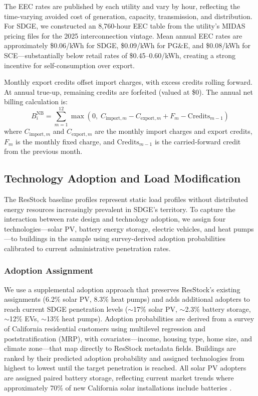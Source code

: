 \documentclass[12pt]{article}
\begin{document}
The EEC rates are published by each utility and vary by hour, reflecting the time-varying avoided cost of generation, capacity, transmission, and distribution. For SDGE, we constructed an 8,760-hour EEC table from the utility's MIDAS pricing files for the 2025 interconnection vintage. Mean annual EEC rates are approximately \$0.06/kWh for SDGE, \$0.09/kWh for PG\&E, and \$0.08/kWh for SCE---substantially below retail rates of \$0.45--0.60/kWh, creating a strong incentive for self-consumption over export.

Monthly export credits offset import charges, with excess credits rolling forward. At annual true-up, remaining credits are forfeited (valued at \$0). The annual net billing calculation is:
\begin{equation}
B_i^{\text{NB}} = \sum_{m=1}^{12} \max\left(0,\; C_{\text{import},m} - C_{\text{export},m} + F_m - \text{Credits}_{m-1}\right)
\end{equation}
where $C_{\text{import},m}$ and $C_{\text{export},m}$ are the monthly import charges and export credits, $F_m$ is the monthly fixed charge, and $\text{Credits}_{m-1}$ is the carried-forward credit from the previous month.

\subsection{Technology Adoption and Load Modification}
\label{sec:tech_adoption_main}

The ResStock baseline profiles represent static load profiles without distributed energy resources increasingly prevalent in SDGE's territory. To capture the interaction between rate design and technology adoption, we assign four technologies---solar PV, battery energy storage, electric vehicles, and heat pumps---to buildings in the sample using survey-derived adoption probabilities calibrated to current administrative penetration rates.

\subsubsection{Adoption Assignment}

We use a supplemental adoption approach that preserves ResStock's existing assignments (6.2\% solar PV, 8.3\% heat pumps) and adds additional adopters to reach current SDGE penetration levels ($\sim$17\% solar PV, $\sim$2.3\% battery storage, $\sim$12\% EVs, $\sim$13\% heat pumps). Adoption probabilities are derived from a survey of California residential customers using multilevel regression and poststratification (MRP), with covariates---income, housing type, home size, and climate zone---that map directly to ResStock metadata fields. Buildings are ranked by their predicted adoption probability and assigned technologies from highest to lowest until the target penetration is reached. All solar PV adopters are assigned paired battery storage, reflecting current market trends where approximately 70\% of new California solar installations include batteries \citep{[citation needed]}.
\end{document}
